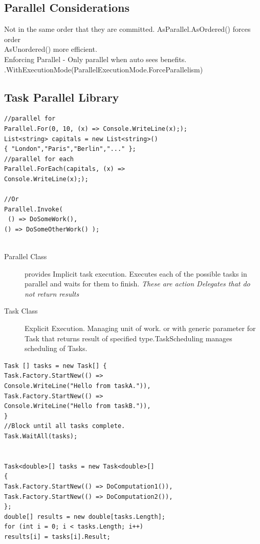 \documentclass[a4paper,10pt]{scrartcl}
\begin{document}
\subsection{Parallel Considerations}
Not in the same order that they are committed. AsParallel.AsOrdered() forces order \\
AsUnordered() more efficient. \\
Enforcing Parallel - Only parallel when auto sees benefits. \\
.WithExecutionMode(ParallelExecutionMode.ForceParallelism)

\subsection{Task Parallel Library}
\begin{lstlisting}[caption=TPL example]
 //parallel for
Parallel.For(0, 10, (x) => Console.WriteLine(x););
List<string> capitals = new List<string>()
{ "London","Paris","Berlin","..." };
//parallel for each
Parallel.ForEach(capitals, (x) =>
Console.WriteLine(x););

//Or
Parallel.Invoke(
 () => DoSomeWork(),
() => DoSomeOtherWork() );


\end{lstlisting}
\begin{description}

\item[Parallel Class] provides Implicit task execution. Executes each of the possible tasks in parallel and waits for them to finish. \textit{These are action Delegates that do not return results}
\item[Task Class] Explicit Execution. Managing unit of work. or with generic parameter for Task that returns result of specified type.TaskScheduling manages scheduling of Tasks.


\end{description}

\begin{lstlisting}[caption=Task Example]
 Task [] tasks = new Task[] {
Task.Factory.StartNew(() =>
Console.WriteLine("Hello from taskA.")),
Task.Factory.StartNew(() =>
Console.WriteLine("Hello from taskB.")),
}
//Block until all tasks complete.
Task.WaitAll(tasks);


Task<double>[] tasks = new Task<double>[]
{
Task.Factory.StartNew(() => DoComputation1()),
Task.Factory.StartNew(() => DoComputation2()),
};
double[] results = new double[tasks.Length];
for (int i = 0; i < tasks.Length; i++)
results[i] = tasks[i].Result;

\end{lstlisting}
\end{document}
